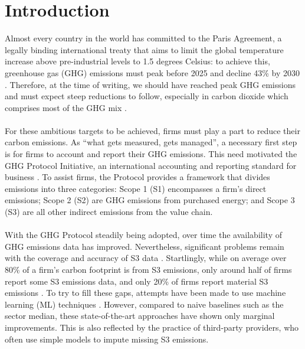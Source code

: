 \documentclass[12pt,twoside]{report}
\begin{document}
\clearpage{\pagestyle{empty}}

\tableofcontents 


\clearpage{\pagestyle{empty}}
\setcounter{page}{1}
\fancyhead[LE,RO]{\slshape \rightmark}
\fancyhead[LO,RE]{\slshape \leftmark}

\chapter{Introduction}

Almost every country in the world has committed to the Paris Agreement, a legally binding international treaty that aims to limit the global temperature increase above pre-industrial levels to 1.5 degrees Celsius: to achieve this, greenhouse gas (GHG) emissions must peak before 2025 and decline 43\% by 2030 \cite{unfcc2024}. Therefore, at the time of writing, we should have reached peak GHG emissions and must expect steep reductions to follow, especially in carbon dioxide which comprises most of the GHG mix \cite{Ritchie2023}. 
\\\\
For these ambitious targets to be achieved, firms must play a part to reduce their carbon emissions. As ``what gets measured, gets managed'', a necessary first step is for firms to account and report their GHG emissions. This need motivated the GHG Protocol Initiative, an international accounting and reporting standard for business \cite{ghgprotocol2004}. To assist firms, the Protocol provides a framework that divides emissions into three categories: Scope 1 (S1) encompasses a firm's direct emissions; Scope 2 (S2) are GHG emissions from purchased energy; and Scope 3 (S3) are all other indirect emissions from the value chain. 
\\\\
With the GHG Protocol steadily being adopted, over time the availability of GHG emissions data has improved. Nevertheless, significant problems remain with the coverage and accuracy of S3 data \cite{Papadopoulos2022}. Startlingly, while on average over 80\% of a firm's carbon footprint is from S3 emissions, only around half of firms report some S3 emissions data, and only 20\% of firms report material S3 emissions \cite{ftserussell2024}. To try to fill these gaps, attempts have been made to use machine learning (ML) techniques \cite{nguyen2021, Nguyenetal2023}. However, compared to naive baselines such as the sector median, these state-of-the-art approaches have shown only marginal improvements. This is also reflected by the practice of third-party providers, who often use simple models to impute missing S3 emissions. 
\end{document}

